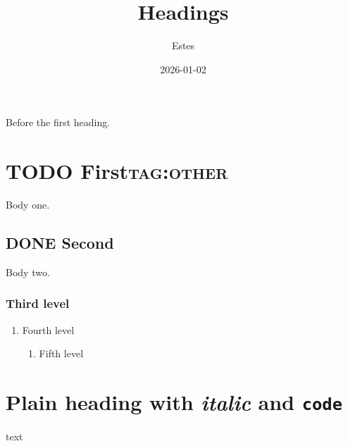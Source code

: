 \documentclass[11pt]{article}
\author{Estes}
\date{2026-01-02}
\title{Headings}
\begin{document}
\maketitle
\tableofcontents

Before the first heading.

\section{{\bfseries\sffamily TODO} First\hfill{}\textsc{tag:other}}
\label{sec:orgc000370}
Body one.
\subsection{{\bfseries\sffamily DONE} Second}
\label{sec:orgb57ab2d}
Body two.
\subsubsection{Third level}
\label{sec:orgaf43af6}
\begin{enumerate}
\item Fourth level
\label{sec:org89dbbc3}
\begin{enumerate}
\item Fifth level
\label{sec:org8f133b6}
\end{enumerate}
\end{enumerate}
\section{Plain heading with \emph{italic} and \texttt{code}}
\label{sec:org593190f}
text
\end{document}
